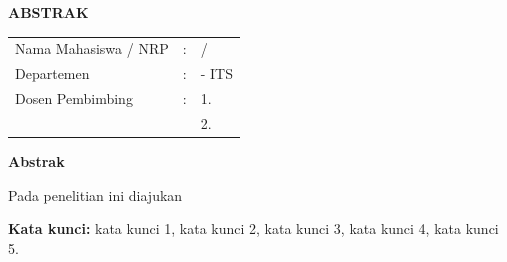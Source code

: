 \begin{center}
  \large\textbf{ABSTRAK}
\end{center}


\begin{center}
  \textbf{\tatitle{}}
\end{center}

\vspace{1ex}

\begingroup
\setlength{\tabcolsep}{0pt}

\noindent
\begin{tabularx}{\textwidth}{l >{\centering}m{2em} X}
  Nama Mahasiswa / NRP & : & \name{} / \nrp{} \\
  Departemen           & : & \department{} \facultyshort{} - ITS \\
  Dosen Pembimbing     & : & 1. \advisor{} \\
                       &   & 2. \coadvisor{} \\
\end{tabularx}
\endgroup

\vspace{2ex}

\noindent\textbf{Abstrak}

Pada penelitian ini diajukan \lipsum[1]

\vspace{2ex}

\noindent\textbf{Kata kunci:} kata kunci 1, kata kunci 2, kata kunci 3, kata kunci 4, kata kunci 5.

